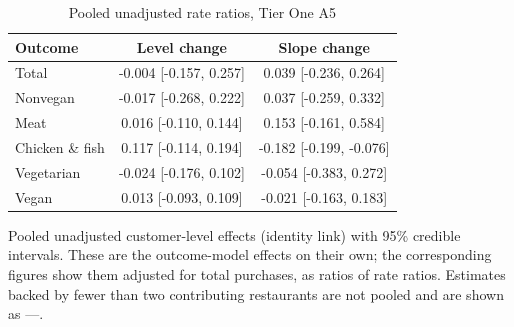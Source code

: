 \begin{table}[H]
\centering
\caption{Pooled unadjusted rate ratios, Tier One A5}
\label{tab:a5_mu_gamma}
\begin{tabular}{lcc}
\toprule
Outcome & Level change & Slope change \\
\midrule
Total & -0.004 [-0.157, 0.257] & 0.039 [-0.236, 0.264] \\
Nonvegan & -0.017 [-0.268, 0.222] & 0.037 [-0.259, 0.332] \\
Meat & 0.016 [-0.110, 0.144] & 0.153 [-0.161, 0.584] \\
Chicken \& fish & 0.117 [-0.114, 0.194] & -0.182 [-0.199, -0.076] \\
Vegetarian & -0.024 [-0.176, 0.102] & -0.054 [-0.383, 0.272] \\
Vegan & 0.013 [-0.093, 0.109] & -0.021 [-0.163, 0.183] \\
\bottomrule
\end{tabular}
\par\smallskip\footnotesize Pooled unadjusted customer-level effects (identity link) with 95\% credible intervals. These are the outcome-model effects on their own; the corresponding figures show them adjusted for total purchases, as ratios of rate ratios. Estimates backed by fewer than two contributing restaurants are not pooled and are shown as ---.
\end{table}
